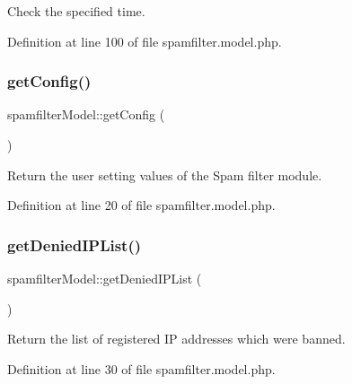 Check the specified time. 



Definition at line 100 of file spamfilter.\+model.\+php.

\hypertarget{classspamfilterModel_a695fa33af1081275d523cb9366645e85}{}\label{classspamfilterModel_a695fa33af1081275d523cb9366645e85} 
\subsubsection{\texorpdfstring{get\+Config()}{getConfig()}}
{\footnotesize\ttfamily spamfilter\+Model\+::get\+Config (\begin{DoxyParamCaption}{ }\end{DoxyParamCaption})}



Return the user setting values of the Spam filter module. 



Definition at line 20 of file spamfilter.\+model.\+php.

\hypertarget{classspamfilterModel_a117cc4509f6046a16e90f8a03e55ed3a}{}\label{classspamfilterModel_a117cc4509f6046a16e90f8a03e55ed3a} 
\subsubsection{\texorpdfstring{get\+Denied\+I\+P\+List()}{getDeniedIPList()}}
{\footnotesize\ttfamily spamfilter\+Model\+::get\+Denied\+I\+P\+List (\begin{DoxyParamCaption}{ }\end{DoxyParamCaption})}



Return the list of registered IP addresses which were banned. 



Definition at line 30 of file spamfilter.\+model.\+php.

\hypertarget{classspamfilterModel_a9fba3707067716e5668f6de7bf54f8f7}{}\label{classspamfilterModel_a9fba3707067716e5668f6de7bf54f8f7} 
